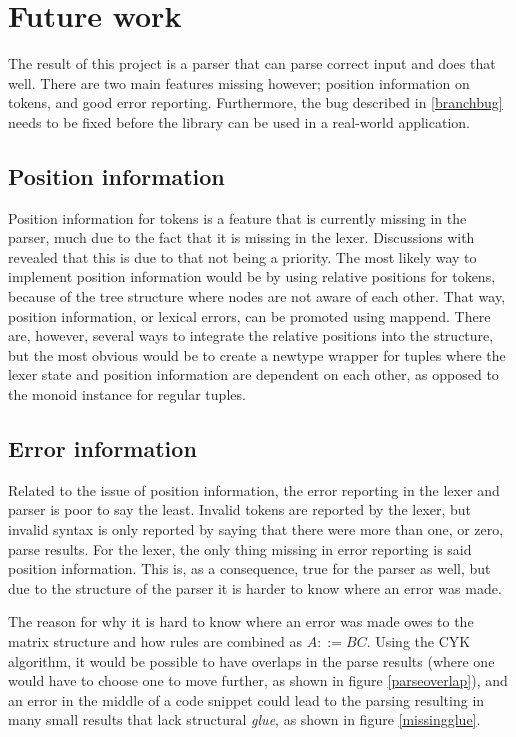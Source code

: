 \documentclass[a4paper,12pt,notitlepage]{report}
\begin{document}
\section{Future work}
\label{futurework}
The result of this project is a parser that can parse correct input and does
that well. There are two main features missing however; position information on
tokens, and good error reporting. Furthermore, the bug described in
\ref{branchbug} needs to be fixed before the library can be used in a real-world
application.

\subsection{Position information}
Position information for tokens is a feature that is currently missing in the
parser, much due to the fact that it is missing in the lexer. Discussions with
\citeauthor{divconqlex} revealed that this is due to that not being a priority.
The most likely way to implement position information would be by using relative
positions for tokens, because of the tree structure where nodes are not aware of
each other. That way, position information, or lexical errors, can be promoted
using mappend. There are, however, several ways to integrate the relative
positions into the structure, but the most obvious would be to create a newtype
wrapper for tuples where the lexer state and position information are dependent
on each other, as opposed to the monoid instance for regular tuples. 

\subsection{Error information}
Related to the issue of position information, the error reporting in the lexer
and parser is poor to say the least. Invalid tokens are reported by the lexer,
but invalid syntax is only reported by saying that there were more than one, or
zero, parse results. For the lexer, the only thing missing in error reporting is
said position information. This is, as a consequence, true for the parser as
well, but due to the structure of the parser it is harder to know where an error
was made.

The reason for why it is hard to know where an error was made owes to the matrix
structure and how rules are combined as $A ::= BC$. Using the CYK algorithm, it
would be possible to have overlaps in the parse results (where one would have to
choose one to move further, as shown in figure \ref{parseoverlap}), and an error
in the middle of a code snippet could lead to the parsing resulting in many
small results that lack structural \textit{glue}, as shown in figure
\ref{missingglue}. 
\end{document}
